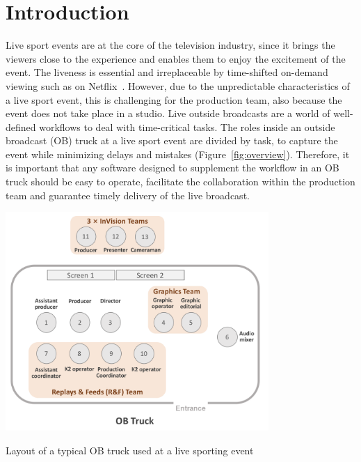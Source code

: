 \documentclass[sigchi-a, authorversion]{acmart}
\begin{document}

\maketitle

\section{Introduction}
 Live sport events are at the core of the television industry, since it brings
 the viewers close to the experience and enables them to enjoy the excitement of the
 event. The liveness is essential and irreplaceable by time-shifted on-demand viewing
 such as on Netflix~\cite{matrix2014netflix}.
 However, due to the unpredictable characteristics of a live sport event, this
 is challenging for the production team, also because the event does not take
 place in a studio. Live outside broadcasts are a world of well-defined
 workflows to deal with time-critical tasks. The roles inside an outside broadcast
 (OB) truck at a live sport event are divided by task, to capture
 the event while minimizing delays and mistakes (Figure~\ref{fig:overview}). Therefore, it is
 important that any software designed to supplement the workflow in an OB truck
 should be easy to operate, facilitate the collaboration within the production team
 and guarantee timely delivery of the live broadcast.

\begin{marginfigure}
\hspace*{-2cm}
    \includegraphics[width=10cm]{Figures/OBtruck.png}
    \caption{Layout of a typical OB truck used at a live sporting event}
    \label{fig:truck}
\end{marginfigure}
\end{document}
